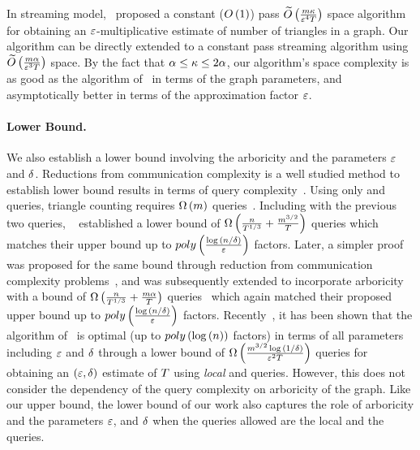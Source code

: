 In streaming model,~\citep{BeraSeshadriStreamingDegeneracy} proposed a constant ($O\left({{1}}\right)$) pass $\widetilde{O}\left({{\frac{m\kappa}{\varepsilon^4T}}}\right)$ space algorithm for obtaining an $\varepsilon$-multiplicative estimate of number of triangles in a graph. Our algorithm can be directly extended to a constant pass streaming algorithm using $\widetilde{O}\left({{\frac{m\alpha}{\varepsilon^3T}}}\right)$ space. By the fact that $\alpha \leq \kappa \leq 2\alpha$, our algorithm's space complexity is as good as the algorithm of~\citep{BeraSeshadriStreamingDegeneracy} in terms of the graph parameters, and asymptotically better in terms of the approximation factor $\varepsilon$.



\paragraph*{Lower Bound.}
We also establish a lower bound involving the arboricity and the parameters $\varepsilon$ and $\delta$. Reductions from communication complexity is a well studied method to establish lower bound results in terms of query complexity~\citep{Blais2012,Goldreich2020}. Using only \degreeq{} and \neighbourq{} queries, triangle counting requires $\Omega\left({{m}}\right)$ queries~\citep{GRS11}. Including \edgeexistsq{} with the previous two queries, ~\citep{Dana_Ron_Triangle_Counting} established a lower bound of $\Omega\left({{\frac{n}{T^{1/3}}+\frac{m^{3/2}}{T}}}\right)$ queries which matches their upper bound up to $poly\left({\frac{\log{\left({n/\delta}\right)}}{\varepsilon}}\right)$ factors. Later, a simpler proof was proposed for the same bound through reduction from communication complexity problems~\citep{DBLP:conf/approx/EdenR18}, and was subsequently extended to incorporate arboricity with a bound of $\Omega\left({{\frac{n}{T^{1/3}}+\frac{m\alpha}{T}}}\right)$ queries~\citep{DBLP:conf/soda/EdenRS20} which again matched their proposed upper bound up to $poly\left({\frac{\log{\left({n/\delta}\right)}}{\varepsilon}}\right)$ factors. Recently~\citep{DBLP:conf/approx/AssadiN22}, it has been shown that the algorithm of~\citep{assadi2018simple} is optimal (up to $poly\left({\log{\left({n}\right)}}\right)$ factors) in terms of all parameters including $\varepsilon$ and $\delta$ through a lower bound of $\Omega\left({{\frac{m^{3/2}\log{\left({1/\delta}\right)}}{\varepsilon^2T}}}\right)$ queries for obtaining an $\left({\varepsilon,\delta}\right)$ estimate of $T$ using \emph{local} and \randedgeq{} queries. However, this does not consider the dependency of the query complexity on arboricity of the graph. Like our upper bound, the lower bound of our work also captures the role of arboricity and the parameters $\varepsilon$, and $\delta$ when the queries allowed are the local and the \randedgeq{} queries.
